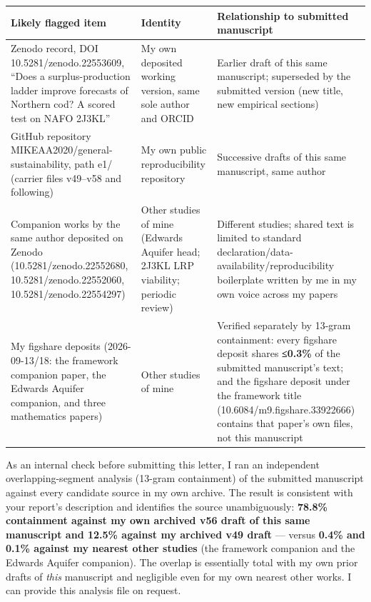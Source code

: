 \documentclass[11pt]{article}
\begin{document}
{\def\LTcaptype{none} %
\begin{longtable}[]{@{}
  >{\raggedright\arraybackslash}p{}
  >{\raggedright\arraybackslash}p{}
  >{\raggedright\arraybackslash}p{}@{}}
\toprule\noalign{}
\begin{minipage}[b]{\linewidth}\raggedright
Likely flagged item
\end{minipage} & \begin{minipage}[b]{\linewidth}\raggedright
Identity
\end{minipage} & \begin{minipage}[b]{\linewidth}\raggedright
Relationship to submitted manuscript
\end{minipage} \\
\midrule\noalign{}
\endhead
\bottomrule\noalign{}
\endlastfoot
Zenodo record, DOI 10.5281/zenodo.22553609, ``Does a surplus-production
ladder improve forecasts of Northern cod? A scored test on NAFO 2J3KL''
& My own deposited working version, same sole author and ORCID & Earlier
draft of this same manuscript; superseded by the submitted version (new
title, new empirical sections) \\
GitHub repository MIKEAA2020/general-sustainability, path e1/ (carrier
files v49--v58 and following) & My own public reproducibility repository
& Successive drafts of this same manuscript, same author \\
Companion works by the same author deposited on Zenodo
(10.5281/zenodo.22552680, 10.5281/zenodo.22552060,
10.5281/zenodo.22554297) & Other studies of mine (Edwards Aquifer head;
2J3KL LRP viability; periodic review) & Different studies; shared text
is limited to standard declaration/data-availability/reproducibility
boilerplate written by me in my own voice across my papers \\
My figshare deposits (2026-09-13/18: the framework companion paper, the
Edwards Aquifer companion, and three mathematics papers) & Other studies
of mine & Verified separately by 13-gram containment: every figshare
deposit shares \textbf{≤0.3\%} of the submitted manuscript's text; and
the figshare deposit under the framework title
(10.6084/m9.figshare.33922666) contains that paper's own files, not this
manuscript \\
\end{longtable}
}

As an internal check before submitting this letter, I ran an independent
overlapping-segment analysis (13-gram containment) of the submitted
manuscript against every candidate source in my own archive. The result
is consistent with your report's description and identifies the source
unambiguously: \textbf{78.8\% containment against my own archived v56
draft of this same manuscript and 12.5\% against my archived v49 draft}
--- versus \textbf{0.4\% and 0.1\% against my nearest other studies}
(the framework companion and the Edwards Aquifer companion). The overlap
is essentially total with my own prior drafts of \emph{this} manuscript
and negligible even for my own nearest other works. I can provide this
analysis file on request.
\end{document}
